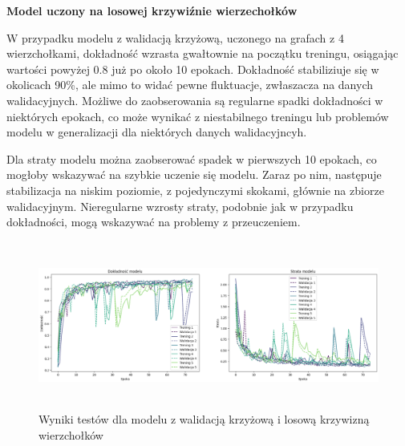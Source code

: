 


\textbf{Model uczony na losowej krzywiźnie wierzechołków}

W przypadku modelu z walidacją krzyżową, uczonego na grafach z 4 wierzchołkami,
dokładność wzrasta gwałtownie na początku treningu,
osiągając wartości powyżej 0.8 już po około 10 epokach.
Dokładność stabiliziuje się w okolicach 90\%, ale mimo to widać pewne fluktuacje, zwłaszacza na danych walidacyjnych.
Możliwe do zaobserowania są regularne spadki dokładności w niektórych epokach,
co może wynikać z niestabilnego treningu lub problemów modelu w generalizacji dla niektórych danych walidacyjncyh.

Dla straty modelu można zaobserować spadek w pierwszych 10 epokach, co mogłoby wskazywać na szybkie uczenie się modelu.
Zaraz po nim, następuje stabilizacja na niskim poziomie, z pojedynczymi skokami, głównie na zbiorze walidacyjnym.
Nieregularne wzrosty straty, podobnie jak w przypadku dokładności, mogą wskazywać na problemy z przeuczeniem.

\begin{figure}[ht]
	\centering
	\includegraphics[height=5.5cm]{resources/tests/images/v3/crossvalid_img.png}
	\caption{Wyniki testów dla modelu z walidacją krzyżową i losową krzywizną wierzchołków}
	\label{Fig:tests-cv-1}
\end{figure}
\FloatBarrier

